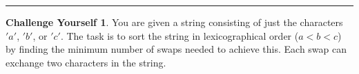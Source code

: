 \documentclass{article}
\theoremstyle{definition}
\newtheorem*{challenge}{Challenge Yourself}
\def\fline{\rule{0.75\linewidth}{0.5pt}}
\newcommand{\finishline}{
  \begin{center}\fline
\end{center}}
\begin{document}
\newpage

\finishline

\begin{challenge}
  You are given a string consisting of just the characters $'a'$, $'b'$, or $'c'$. The task is to sort the string in lexicographical order ($a < b < c$) by finding the minimum number of swaps needed to achieve this. Each swap can exchange two characters in the string.

\end{challenge}
\end{document}
